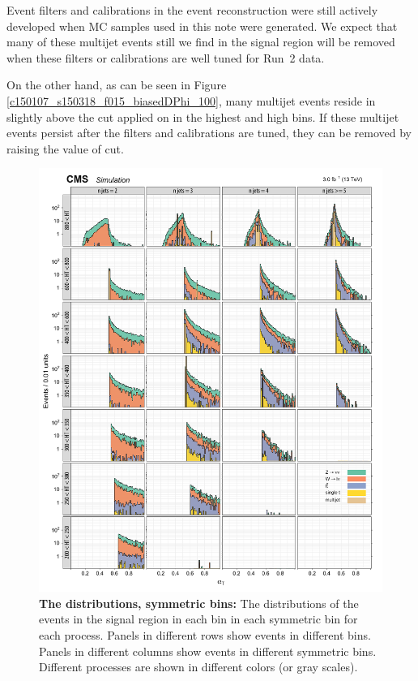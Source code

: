 Event filters and calibrations in the event reconstruction were still
actively developed when MC samples used in this note were generated.
We expect that many of these multijet events still we find in the
signal region will be removed when these filters or calibrations are
well tuned for Run~2 data.

On the other hand, as can be seen in Figure
\ref{c150107_s150318_f015_biasedDPhi_100}, many multijet events reside
in slightly above the cut applied on \bdphi in the highest \scalht and
high \njet bins. If these multijet events persist after the filters and
calibrations are tuned, they can be removed by raising the value of
\bdphi cut.





\begin{figure}[!h]
\centering
\includegraphics[scale=0.95]{figures/kiplots/c150107_s150318_f015_alphaT_100}
\caption{\textbf{\boldmath The \alphat distributions, symmetric \njet
bins:} The \alphat distributions of the events in the signal region in
each \scalht bin in each symmetric \njet bin for each process. Panels in
different rows show events in different \scalht bins. Panels in
different columns show events in different symmetric \njet bins.
Different processes are shown in different colors (or gray scales).}
\label{c150107_s150318_f015_alphaT_100}
\end{figure}

